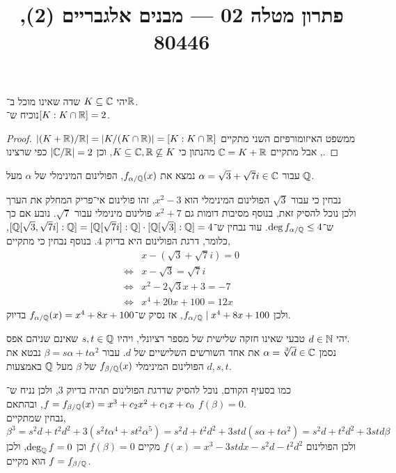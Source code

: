 
\title{פתרון מטלה 02 --- מבנים אלגבריים (2), 80446}


\maketitle
\maketitleprint{}

\question{}
יהי $K \subseteq \mathbb{C}$ שדה שאינו מוכל ב־$\mathbb{R}$. \\
נוכיח ש־$[K : K \cap \mathbb{R}] = 2$.
\begin{proof}
	ממשפט האיזומורפיזם השני מתקיים $|(K + \mathbb{R}) / \mathbb{R}| = |K / (K \cap \mathbb{R})| = [K : K \cap \mathbb{R}]$, אבל מתקיים $\mathbb{C} = K + \mathbb{R}$ מהנתון כי $K \subseteq \mathbb{C}, \mathbb{R} \not\subseteq K$, וכן $|\mathbb{C} / \mathbb{R}| = 2$ כפי שרצינו.
\end{proof}

\question{}
\subquestion{}
עבור $\alpha = \sqrt{3} + \sqrt{7} i \in \mathbb{C}$ נמצא את $f_{\alpha / \mathbb{Q}}(x)$, הפולינום המינימלי של $\alpha$ מעל $\mathbb{Q}$.
\begin{solution}
	נבחין כי עבור $\sqrt{3}$ הפולינום המינימלי הוא $x^2 - 3$, זהו פולינום אי־פריק המחלק את הערך ולכן נוכל להסיק זאת, בנוסף מסיבות דומות גם $x^2 + 7$ פולינום מינימלי עבור $\sqrt{7}$.
	נובע אם כך ש־$\deg f_{\alpha / \mathbb{Q}} \le 4$.
	עוד נבחין ש־$[\mathbb{Q}[\sqrt{3}, \sqrt{7}i] : \mathbb{Q}] = [\mathbb{Q}[\sqrt{7}i] : \mathbb{Q}] \cdot [\mathbb{Q}[\sqrt{3}] : \mathbb{Q}] = 4$, כלומר, דרגת הפולינום היא בדיוק $4$.
	בנוסף נבחין כי מתקיים,
	\begin{align*}
		& x - (\sqrt{3} + \sqrt{7} i) = 0 \\
		\iff & x - \sqrt{3} = \sqrt{7} i \\
		\iff & x^2 - 2 \sqrt{3} x + 3 = -7 \\
		\iff & x^4 + 20x + 100 = 12x
	\end{align*}
	ולכן $f_{\alpha / \mathbb{Q}} \mid x^4 + 8x + 100$, אז נסיק ש־$f_{\alpha / \mathbb{Q}}(x) = x^4 + 8x + 100$ בדיוק.
\end{solution}

\subquestion{}
יהי $d \in \mathbb{N}$ טבעי שאינו חזקה שלישית של מספר רציונלי, ויהיו $s, t \in \mathbb{Q}$ שאינם שניהם אפס. \\
נסמן $\alpha = \sqrt[3]{d} \in \mathbb{C}$ את אחד השורשים השלישיים של $d$.
עבור $\beta = s \alpha + t \alpha^2$ נבטא את הפולינום המינימלי $f_{\beta / \mathbb{Q}}(x)$ של $\beta$ מעל $\mathbb{Q}$ באמצעות $d, s, t$.
\begin{solution}
	כמו בסעיף הקודם, נוכל להסיק שדרגת הפולינום תהיה בדיוק $3$, ולכן נניח ש־$f = f_{\beta / \mathbb{Q}}(x) = x^3 + c_2 x^2 + c_1 x + c_0$, ובהתאם $f(\beta) = 0$. \\
	נבחין שמתקיים,
	\[
		\beta^3
		= s^2 d + t^2 d^2 + 3(s^2 t \alpha^4 + s t^2 \alpha^5)
		= s^2 d + t^2 d^2 + 3std (s \alpha + t \alpha^2)
		= s^2 d + t^2 d^2 + 3std \beta
	\]
	ולכן הפולינום $f(x) = x^3 - 3std x - s^2 d - t^2 d^2$ מקיים $f(\beta) = 0$ וכן $\deg_{\mathbb{Q}} f = 0$, ולכן הוא מקיים $f = f_{\beta / \mathbb{Q}}$.
\end{solution}

